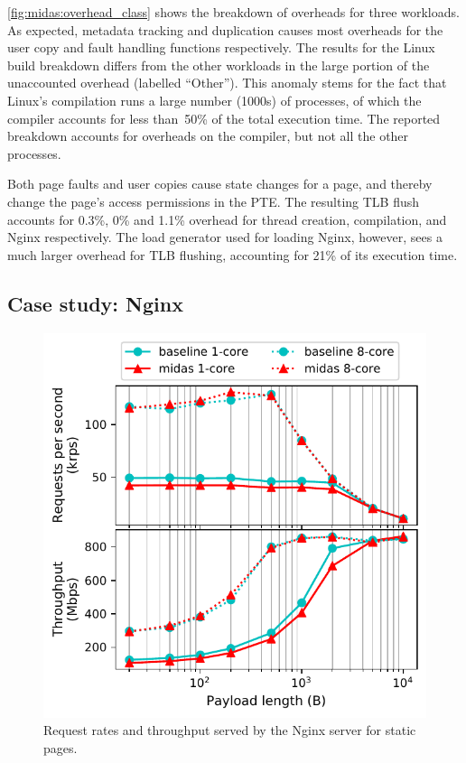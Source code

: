 \autoref{fig:midas:overhead_class} shows the breakdown of overheads for three
workloads.
As expected, metadata tracking and duplication causes most overheads
for the user copy and fault handling functions respectively.
The results for the Linux build breakdown differs 
from the other workloads
in the large portion of
the unaccounted overhead (labelled ``Other'').
This anomaly stems for the fact that Linux's compilation runs a large number (1000s)
of processes, of which the compiler accounts for less than~50\% of the
total execution time.
The reported breakdown accounts for overheads on the compiler, but not
all the other processes.

Both page faults and user copies cause state changes for a page, and thereby
change the page's access permissions in the PTE.
The resulting TLB flush accounts for 0.3\%, 0\% and 1.1\% overhead for
thread creation, compilation, and Nginx respectively.
The load generator  used for loading Nginx, however, sees
a much larger overhead for TLB flushing, accounting for
21\% of its execution time.

\subsection{Case study: Nginx}

\begin{figure}[ht!]
  \centering
  \includegraphics[width=0.75\linewidth]{media/midas/nginx_performance.pdf}
  \caption[\midas: Request rates and throughput for the Nginx server]
          {Request rates and throughput served by the Nginx server for
          static pages.}
  \label{fig:midas:nginx_perf}
\end{figure}

